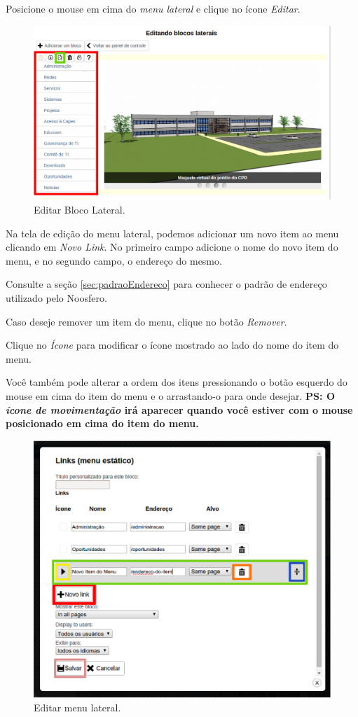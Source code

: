 Posicione o mouse em cima do \emph{\color{red}menu lateral} e clique no ícone \emph{\color{green}Editar}.

\begin{figure}[h]
     \centering
       \includegraphics[keepaspectratio=true,scale=0.4]{figuras/editarBlocoLateral.eps}
     \caption{Editar Bloco Lateral.}
     \label{fig:editarBloco}
\end{figure}

\newpage
Na tela de edição do menu lateral, podemos adicionar um novo item ao menu clicando em \emph{\color{red}Novo Link}. No primeiro campo adicione o nome do novo item do menu, e no segundo campo, o endereço do mesmo.

Consulte a seção \ref{sec:padraoEndereco} para conhecer o padrão de endereço utilizado pelo Noosfero.

Caso deseje remover um item do menu, clique no botão \emph{\color{orange}Remover}.

Clique no \emph{\color{yellow}Ícone} para modificar o ícone mostrado ao lado do nome do item do menu.

Você também pode alterar a ordem dos itens pressionando o botão esquerdo do mouse em cima do item do menu e o arrastando-o para onde desejar. 
\textbf{PS: O \emph{\color{blue}ícone de movimentação} irá aparecer quando você estiver com o mouse posicionado em cima do item do menu.}

\begin{figure}[h]
     \centering
       \includegraphics[keepaspectratio=true,scale=0.4]{figuras/editarMenuLateral.eps}
     \caption{Editar menu lateral.}
     \label{fig:editarMenuLateral}
\end{figure}
